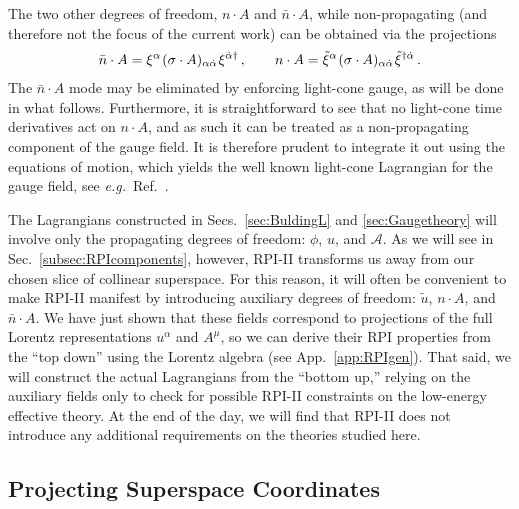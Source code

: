\documentclass[12pt,document,nofootinbib,superscriptaddress,onecolumn,preprintnumbers,balancelastpage]{article}
\newcommand{\s}{\hspace{0.8pt}}
\DeclareRobustCommand{\Sec}[1]{Sec.~\ref{#1}}
\DeclareRobustCommand{\Secs}[2]{Secs.~\ref{#1} and \ref{#2}}
\DeclareRobustCommand{\App}[1]{App.~\ref{#1}}
\DeclareRobustCommand{\Ref}[1]{Ref.~\cite{#1}}
\newcommand{\alc}{\mathcal{A}}
\newcommand{\uu}{\tilde u}
\begin{document}
\begin{spacing}{1.2}
The two other degrees of freedom, $n\cdot A$ and $\bar{n} \cdot A$, while non-propagating (and therefore not the focus of the current work) can be obtained via the projections 
\begin{align}
\bar n \cdot A = \xi^\alpha\s (\sigma \cdot A)_{\alpha \dot{\alpha}}\s \xi^{\dot{\alpha} \dagger} \, , \quad \quad  n\cdot A = \tilde \xi^\alpha\s (\sigma \cdot A)_{\alpha \dot{\alpha}}\s \tilde \xi^{\dagger \dot{\alpha}} \,.
\label{eq:nAandnBarA}
\end{align}
%
The $\bar{n}\cdot A$ mode may be eliminated by enforcing light-cone gauge, as will be done in what follows.
%
Furthermore, it is straightforward to see that no light-cone time derivatives act on $n\cdot A$, and as such it can be treated as a non-propagating component of the gauge field.
%
It is therefore prudent to integrate it out using the equations of motion, which yields the well known light-cone Lagrangian for the gauge field, see \emph{e.g.}~\Ref{Leibbrandt:1983pj}.  


The Lagrangians constructed in \Secs{sec:BuldingL}{sec:Gaugetheory} will involve only the propagating degrees of freedom:  $\phi$, $u$, and $\alc$.
%
As we will see in \Sec{subsec:RPIcomponents}, however, RPI-II transforms us away from our chosen slice of collinear superspace.
%
For this reason, it will often be convenient to make RPI-II manifest by introducing auxiliary degrees of freedom:  $\uu$, $n \cdot A$, and $\bar{n}\cdot A$.
%
We have just shown that these fields correspond to projections of the full Lorentz representations $u^\alpha$ and $A^\mu$, so we can derive their RPI properties from the ``top down'' using the Lorentz algebra (see \App{app:RPIgen}).
%
That said, we will construct the actual Lagrangians from the ``bottom up,'' relying on the auxiliary fields only to check for possible RPI-II constraints on the low-energy effective theory.
%
At the end of the day, we will find that RPI-II does not introduce any additional requirements on the theories studied here.


\subsection{Projecting Superspace Coordinates}


\end{spacing}
\end{document}
